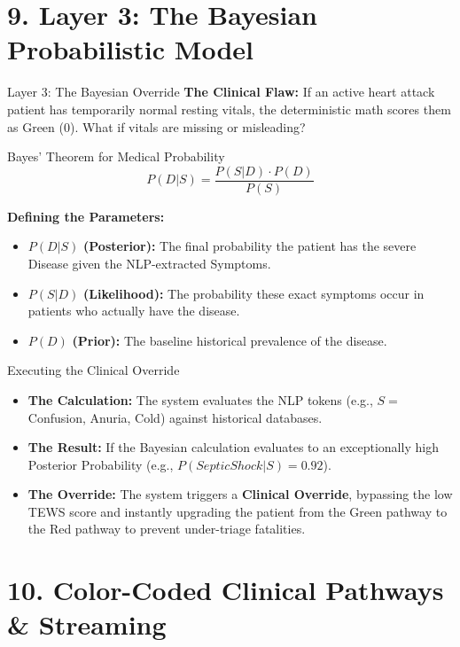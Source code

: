 \documentclass[aspectratio=169]{beamer}
\begin{document}
	\section{9. Layer 3: The Bayesian Probabilistic Model}
	
	\begin{frame}{Layer 3: The Bayesian Override}
		\textbf{The Clinical Flaw:} If an active heart attack patient has temporarily normal resting vitals, the deterministic math scores them as Green (0). What if vitals are missing or misleading?
		
		\begin{block}{Bayes' Theorem for Medical Probability}
			$$P(D|S)=\frac{P(S|D)\cdot P(D)}{P(S)}$$
		\end{block}
		
		\textbf{Defining the Parameters:}
		\begin{itemize}
			\item $P(D|S)$ \textbf{(Posterior):} The final probability the patient has the severe Disease given the NLP-extracted Symptoms.
			\item $P(S|D)$ \textbf{(Likelihood):} The probability these exact symptoms occur in patients who actually have the disease.
			\item $P(D)$ \textbf{(Prior):} The baseline historical prevalence of the disease.
		\end{itemize}
	\end{frame}
	
	\begin{frame}{Executing the Clinical Override}
		\begin{itemize}
			\item \textbf{The Calculation:} The system evaluates the NLP tokens (e.g., $S =$ Confusion, Anuria, Cold) against historical databases.
			\item \textbf{The Result:} If the Bayesian calculation evaluates to an exceptionally high Posterior Probability (e.g., $P(SepticShock|S) = 0.92$).
			\item \textbf{The Override:} The system triggers a \textbf{Clinical Override}, bypassing the low TEWS score and instantly upgrading the patient from the Green pathway to the Red pathway to prevent under-triage fatalities.
		\end{itemize}
	\end{frame}
	
	\section{10. Color-Coded Clinical Pathways \& Streaming}
	
\end{document}
